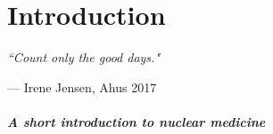 \documentclass[twoside,english]{uiofysmaster/uiofysmaster}
\begin{document}
\chapter{Introduction}

\epigraph{\itshape ``Count only the good days."}{--- \textup{ Irene Jensen}, Ahus 2017}
 









\paragraph{A short introduction to nuclear medicine} \mbox{}
\end{document}
